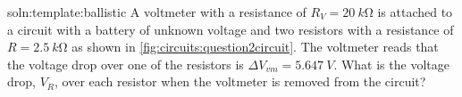 \begin{problem}{soln:template:ballistic}{\label{prob:template:ballistic}}
	A voltmeter with a resistance of $R_V = \SI{20}{k\ohm}$ is attached to a circuit with a battery of unknown voltage and two resistors with a resistance of $R = \SI{2.5}{k\ohm}$ as shown in \ref{fig:circuits:question2circuit}. The voltmeter reads that the voltage drop over one of the resistors is $\Delta V_{vm} = \SI{5.647}{V}$. What is the voltage drop, $V_R$, over each resistor when the voltmeter is removed from the circuit?
	
	
	
\end{problem}

\newpage
